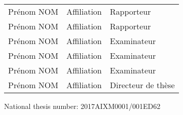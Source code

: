 \begin{titlepage}
\begin{tabular}{lll}
	Prénom NOM & Affiliation & Rapporteur \\
    \vspace{0.08cm}
	Prénom NOM & Affiliation & Rapporteur \\
    \vspace{0.08cm}
	Prénom NOM & Affiliation & Examinateur \\
    \vspace{0.08cm}
	Prénom NOM & Affiliation & Examinateur \\
    \vspace{0.08cm}
	Prénom NOM & Affiliation & Examinateur \\
    \vspace{0.08cm}
	Prénom NOM & Affiliation & Directeur de thèse \\
\end{tabular}

\vspace{0.4cm}
\begin{flushleft}\normalsize National thesis number: 2017AIXM0001/001ED62\\\end{flushleft}
\selectfont{}

\end{titlepage}